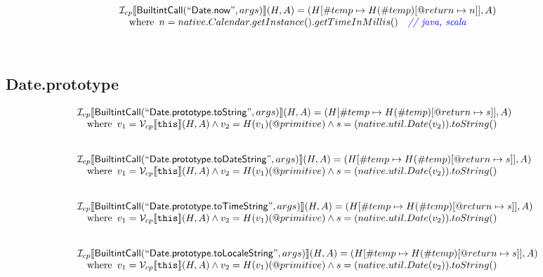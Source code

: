 \[\begin{array}{l}
\mathcal{I} _{cp}\llbracket \mbox{\textsf{BuiltintCall}}(``\mbox{\textsf{Date.now}}",args)\rrbracket(H,A)
  = (H[\#temp \mapsto H(\#temp)[@return \mapsto n]], A)\\
\quad{\rm where}\begin{array}[t]{l}
  n = native.Calendar.getInstance().getTimeInMillis() \quad\textit{{\color{blue}// java, scala}}\\
  \end{array}\\
\\\\
\end{array}
\]
\subsection{Date.prototype}
\[
\begin{array}{l}

\mathcal{I} _{cp}\llbracket \mbox{\textsf{BuiltintCall}}(``\mbox{\textsf{Date.prototype.toString}}",args)\rrbracket(H,A)
  = (H[\#temp \mapsto H(\#temp)[@return \mapsto s]], A)\\
\quad{\rm where}\begin{array}[t]{l}
  v_1 = \mathcal{V} _{cp}\llbracket \mbox{\texttt{this}}\rrbracket (H,A) \land v_2 = H(v_1)(@primitive)
  \land s = (native.util.Date(v_2)).toString()
  \end{array}\\
\\\\


\mathcal{I} _{cp}\llbracket \mbox{\textsf{BuiltintCall}}(``\mbox{\textsf{Date.prototype.toDateString}}",args)\rrbracket(H,A)
  = (H[\#temp \mapsto H(\#temp)[@return \mapsto s]], A)\\
\quad{\rm where}\begin{array}[t]{l}
  v_1 = \mathcal{V} _{cp}\llbracket \mbox{\texttt{this}}\rrbracket (H,A) \land v_2 = H(v_1)(@primitive)
  \land s = (native.util.Date(v_2)).toString()
  \end{array}\\
\\\\


\mathcal{I} _{cp}\llbracket \mbox{\textsf{BuiltintCall}}(``\mbox{\textsf{Date.prototype.toTimeString}}",args)\rrbracket(H,A)
  = (H[\#temp \mapsto H(\#temp)[@return \mapsto s]], A)\\
\quad{\rm where}\begin{array}[t]{l}
  v_1 = \mathcal{V} _{cp}\llbracket \mbox{\texttt{this}}\rrbracket (H,A) \land v_2 = H(v_1)(@primitive)
  \land s = (native.util.Date(v_2)).toString()
  \end{array}\\
\\\\


\mathcal{I} _{cp}\llbracket \mbox{\textsf{BuiltintCall}}(``\mbox{\textsf{Date.prototype.toLocaleString}}",args)\rrbracket(H,A)
  = (H[\#temp \mapsto H(\#temp)[@return \mapsto s]], A)\\
\quad{\rm where}\begin{array}[t]{l}
  v_1 = \mathcal{V} _{cp}\llbracket \mbox{\texttt{this}}\rrbracket (H,A) \land v_2 = H(v_1)(@primitive)
  \land s = (native.util.Date(v_2)).toString()
  \end{array}\\
\\\\



\end{array}\]
